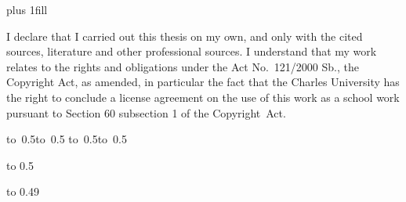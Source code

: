 \newpage


\openright
\hypersetup{pageanchor=true}
\vglue 0pt plus 1fill

\noindent
I declare that I carried out this \ThesisTypeName{} thesis on my own, and only with the cited
sources, literature and other professional sources.
I understand that my work relates to the rights and obligations under the Act No.~121/2000 Sb.,
the Copyright Act, as amended, in particular the fact that the Charles
University has the right to conclude a license agreement on the use of this
work as a school work pursuant to Section 60 subsection 1 of the Copyright~Act.

\vspace{10mm}

\hbox{\hbox to 0.5\hbox to 0.5\hsize{\dotfill\quad}}
\smallskip
\hbox{\hbox to 0.5\hsize{}\hbox to 0.5}

\vspace{20mm}
\newpage


\openright

\noindent
\Dedication

\newpage


\openright
{\InfoPageFont

\vtop to 0.5


\ifx\StudyLanguage\LangCS

\vtop to 0.49

\fi

}

\newpage

\pagestyle{plain}
